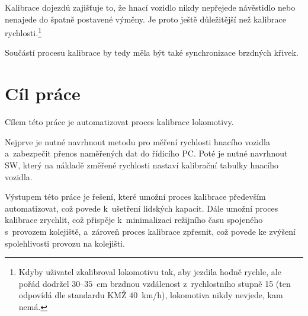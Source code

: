 Kalibrace dojezdů zajišťuje to, že hnací vozidlo nikdy nepřejede návěstidlo nebo
nenajede do špatně postavené výměny. Je proto ještě důležitější než kalibrace
rychlosti.\footnote{Kdyby uživatel zkalibroval lokomotivu tak, aby jezdila
hodně rychle, ale pořád dodržel $30$--$35$~cm brzdnou vzdálenost z~rychlostního
stupně 15 (ten odpovídá dle standardu KMŽ $40$~km/h), lokomotiva nikdy nevjede,
kam nemá.}

Součástí procesu kalibrace by tedy měla být také synchronizace brzdných křivek.

\section{Cíl práce}
\label{sec:cil}

Cílem této práce je automatizovat proces kalibrace lokomotivy.

Nejprve je nutné navrhnout metodu pro měření rychlosti hnacího vozidla
a~zabezpečit přenos naměřených dat do řídicího PC. Poté je nutné navrhnout SW,
který na nákladě změřené rychlosti nastaví kalibrační tabulky hnacího vozidla.

Výstupem této práce je řešení, které umožní proces kalibrace především
automatizovat, což povede k~ušetření lidských kapacit. Dále umožní proces
kalibrace zrychlit, což přispěje k~minimalizaci režijního času spojeného
s~provozem kolejiště, a~zároveň proces kalibrace zpřesnit, což povede ke
zvýšení spolehlivosti provozu na kolejišti.
